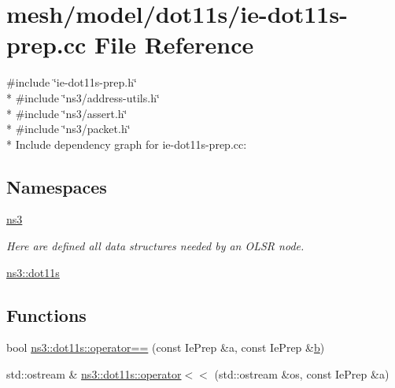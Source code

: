 \hypertarget{ie-dot11s-prep_8cc}{}\section{mesh/model/dot11s/ie-\/dot11s-\/prep.cc File Reference}
\label{ie-dot11s-prep_8cc}
{\ttfamily \#include \char`\"{}ie-\/dot11s-\/prep.\+h\char`\"{}}\\*
{\ttfamily \#include \char`\"{}ns3/address-\/utils.\+h\char`\"{}}\\*
{\ttfamily \#include \char`\"{}ns3/assert.\+h\char`\"{}}\\*
{\ttfamily \#include \char`\"{}ns3/packet.\+h\char`\"{}}\\*
Include dependency graph for ie-\/dot11s-\/prep.cc\+:
\subsection*{Namespaces}
\begin{DoxyCompactItemize}
\item 
 \hyperlink{namespacens3}{ns3}
\begin{DoxyCompactList}\small\item\em Here are defined all data structures needed by an O\+L\+SR node. \end{DoxyCompactList}\item 
 \hyperlink{namespacens3_1_1dot11s}{ns3\+::dot11s}
\end{DoxyCompactItemize}
\subsection*{Functions}
\begin{DoxyCompactItemize}
\item 
bool \hyperlink{namespacens3_1_1dot11s_ae66899f8527cbcb352641ad7be578d3c}{ns3\+::dot11s\+::operator==} (const Ie\+Prep \&a, const Ie\+Prep \&\hyperlink{lte__pathloss_8m_a21ad0bd836b90d08f4cf640b4c298e7c}{b})
\item 
std\+::ostream \& \hyperlink{namespacens3_1_1dot11s_aba902fc751de915aef23553575d43c57}{ns3\+::dot11s\+::operator$<$$<$} (std\+::ostream \&os, const Ie\+Prep \&a)
\end{DoxyCompactItemize}
